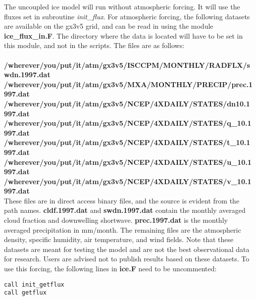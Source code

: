 The uncoupled ice model will run without atmospheric forcing.  It will use
the fluxes set in subroutine {\it init\_flux}.  For atmospheric forcing, the following
datasets are available on the gx3v5 grid, and can be read in using the module
{\bf ice\_flux\_in.F}.  The directory where the data is located will have to be set
in this module, and not in the scripts. The files are as follows: \\

 \\
{\bf /wherever/you/put/it/atm/gx3v5/ISCCPM/MONTHLY/RADFLX/swdn.1997.dat} \\
{\bf /wherever/you/put/it/atm/gx3v5/MXA/MONTHLY/PRECIP/prec.1997.dat}    \\
{\bf /wherever/you/put/it/atm/gx3v5/NCEP/4XDAILY/STATES/dn10.1997.dat}   \\
{\bf /wherever/you/put/it/atm/gx3v5/NCEP/4XDAILY/STATES/q\_10.1997.dat}  \\
{\bf /wherever/you/put/it/atm/gx3v5/NCEP/4XDAILY/STATES/t\_10.1997.dat}  \\
{\bf /wherever/you/put/it/atm/gx3v5/NCEP/4XDAILY/STATES/u\_10.1997.dat} \\
{\bf /wherever/you/put/it/atm/gx3v5/NCEP/4XDAILY/STATES/v\_10.1997.dat} \\

These files are in direct access binary files, and the source is evident
from the path names.  {\bf cldf.1997.dat} and {\bf swdn.1997.dat} contain
the monthly averaged cloud fraction and downwelling shortwave.
{\bf prec.1997.dat} is the monthly averaged precipitation in mm/month.
The remaining files are the atmospheric density, specific humidity,
air temperature, and wind fields.
Note that these datasets are meant for testing the model and are
not the best observational data for research.  Users are advised not to
publish results based on these datasets.  To use this forcing, the
following lines in {\bf ice.F} need to be uncommented:

\begin{verbatim}
call init_getflux
call getflux
\end{verbatim}

